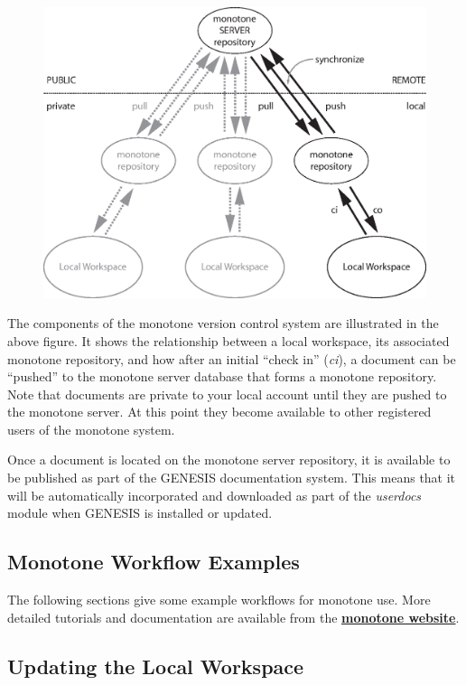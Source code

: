 \documentclass[12pt]{article}
\begin{document}
\begin{figure}[h]
  \centering
 \includegraphics[scale=0.6]{figures/monotone.eps}
  \label{fig:monotone}
\end{figure}

The components of the monotone version control system are illustrated in the above figure. It shows the relationship between a local workspace, its associated monotone repository, and how after an initial ``check in'' ({\it ci}), a document can be ``pushed'' to the monotone server database that forms a monotone repository. Note that documents are private to your local account until they are pushed to the monotone server. At this point they become available to other registered users of the monotone system.

Once a document is located on the monotone server repository, it is available to be published as part of the GENESIS documentation system. This means that it will be automatically incorporated and downloaded as part of the {\it userdocs} module when GENESIS is installed or updated.

\subsection*{Monotone Workflow Examples}

The following sections give some example workflows for monotone use. More detailed tutorials and documentation are available from the \href{http://www.monotone.ca/docs/index.html}{\bf monotone website}.

\subsection*{Updating the Local Workspace}
\end{document}
